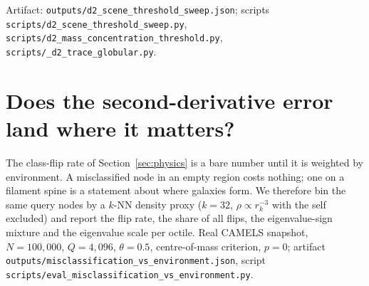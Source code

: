 \noindent Artifact: \texttt{outputs/\allowbreak d2\_\allowbreak scene\_\allowbreak threshold\_\allowbreak sweep.\allowbreak json};
scripts \texttt{scripts/\allowbreak d2\_\allowbreak scene\_\allowbreak threshold\_\allowbreak sweep.\allowbreak py},
\texttt{scripts/\allowbreak d2\_\allowbreak mass\_\allowbreak concentration\_\allowbreak threshold.\allowbreak py}, \texttt{scripts/\allowbreak \_\allowbreak d2\_\allowbreak trace\_\allowbreak globular.\allowbreak py}.

\section{Does the second-derivative error land where it matters?}\label{app:environment}
The class-flip rate of Section~\ref{sec:physics} is a bare number until it is weighted by environment.
A misclassified node in an empty region costs nothing; one on a filament spine is a statement about
where galaxies form. We therefore bin the same query nodes by a $k$-NN density proxy ($k=32$,
$\rho\propto r_k^{-3}$ with the self excluded) and report the flip rate, the share of all flips, the
eigenvalue-sign mixture and the eigenvalue scale per octile. Real CAMELS snapshot, $N=100{,}000$,
$Q=4{,}096$, $\theta=0.5$, centre-of-mass criterion, $p{=}0$; artifact
\texttt{outputs/\allowbreak misclassification\_\allowbreak vs\_\allowbreak environment.\allowbreak json}, script
\texttt{scripts/\allowbreak eval\_\allowbreak misclassification\_\allowbreak vs\_\allowbreak environment.\allowbreak py}.

\begin{center}
\end{center}

